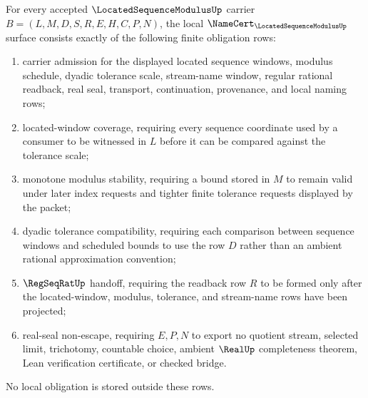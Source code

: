 \begin{theorem}
\label{thm:located-sequence-modulus-namecert-obligations}
For every accepted $\LocatedSequenceModulusUp$ carrier $B=(L,M,D,S,R,E,H,C,P,N)$, the local $\NameCert_{\LocatedSequenceModulusUp}$ surface consists exactly of the following finite obligation rows:
\begin{enumerate}
\item carrier admission for the displayed located sequence windows, modulus schedule, dyadic tolerance scale, stream-name window, regular rational readback, real seal, transport, continuation, provenance, and local naming rows;
\item located-window coverage, requiring every sequence coordinate used by a consumer to be witnessed in $L$ before it can be compared against the tolerance scale;
\item monotone modulus stability, requiring a bound stored in $M$ to remain valid under later index requests and tighter finite tolerance requests displayed by the packet;
\item dyadic tolerance compatibility, requiring each comparison between sequence windows and scheduled bounds to use the row $D$ rather than an ambient rational approximation convention;
\item $\RegSeqRatUp$ handoff, requiring the readback row $R$ to be formed only after the located-window, modulus, tolerance, and stream-name rows have been projected;
\item real-seal non-escape, requiring $E,P,N$ to export no quotient stream, selected limit, trichotomy, countable choice, ambient $\RealUp$ completeness theorem, Lean verification certificate, or checked bridge.
\end{enumerate}
No local obligation is stored outside these rows.
\end{theorem}
